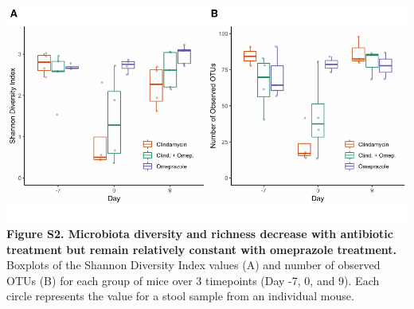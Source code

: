 \documentclass[11pt,]{article}
\begin{document}
\newpage

\includegraphics{figure_s2.pdf} \textbf{Figure S2. Microbiota diversity
and richness decrease with antibiotic treatment but remain relatively
constant with omeprazole treatment.} Boxplots of the Shannon Diversity
Index values (A) and number of observed OTUs (B) for each group of mice
over 3 timepoints (Day -7, 0, and 9). Each circle represents the value
for a stool sample from an individual mouse.
\end{document}
